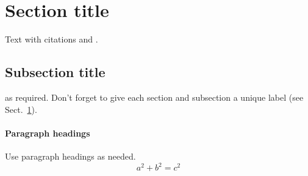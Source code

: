 \documentclass[smallextended]{svjour3}       %
\begin{document}
\section{Section title}
\label{sec:1}
Text with citations \cite{RefB} and \cite{RefJ}.
\subsection{Subsection title}
\label{sec:2}
as required. Don't forget to give each section
and subsection a unique label (see Sect.~\ref{sec:1}).
\paragraph{Paragraph headings} Use paragraph headings as needed.
\begin{equation}
a^2+b^2=c^2
\end{equation}
\end{document}

